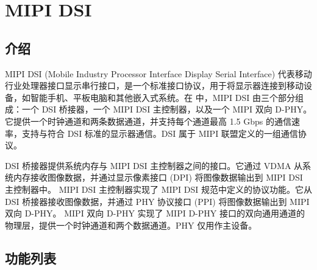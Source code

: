 \documentclass[main\_\_CN.tex]{subfiles}
\begin{document}

\ifglobal
\else
    {\let\clearpage\relax \listoftodos}
    {\let\clearpage\relax \listofdonetodos}
    \tableofcontents
\fi



\hypertarget{mipidsi}{}
\chapter{MIPI DSI}
\label{mod:mipidsi}



\section{介绍}
MIPI DSI (Mobile Industry Processor Interface Display Serial Interface) 代表移动行业处理器接口显示串行接口，是一个标准接口协议，用于将显示器连接到移动设备，如智能手机、平板电脑和其他嵌入式系统。在 \chipseries{} 中，MIPI DSI 由三个部分组成：一个 DSI 桥接器，一个 MIPI DSI 主控制器，以及一个 MIPI 双向 D-PHY。它提供一个时钟通道和两条数据通道，并支持每个通道最高 1.5 Gbps 的通信速率，支持与符合 DSI 标准的显示器通信。DSI 属于 MIPI 联盟定义的一组通信协议。

DSI 桥接器提供系统内存与 MIPI DSI 主控制器之间的接口。它通过 VDMA 从系统内存接收图像数据，并通过显示像素接口 (DPI) 将图像数据输出到 MIPI DSI 主控制器中。
MIPI DSI 主控制器实现了 MIPI DSI 规范中定义的协议功能。它从 DSI 桥接器接收图像数据，并通过 PHY 协议接口 (PPI) 将图像数据输出到 MIPI 双向 D-PHY。
MIPI 双向 D-PHY 实现了 MIPI D-PHY 接口的双向通用通道的物理层，提供一个时钟通道和两个数据通道。PHY 仅用作主设备。





\section{功能列表}
\label{sec:mipidsi-features}
\end{document}
